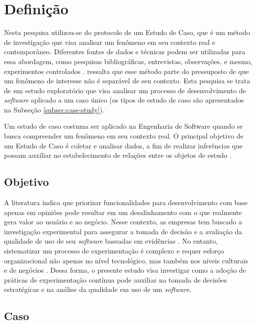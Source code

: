 \section{Definição}

Nesta pesquisa utilizou-se do protocolo de um Estudo de Caso, que é um método de investigação que visa analisar um fenômeno em seu contexto real e contemporâneo. Diferentes fontes de dados e técnicas podem ser utilizadas para essa abordagem, como pesquisas bibliográficas, entrevistas, observações, e mesmo, experimentos controlados \cite{wohlin_experimentation_2012}.  ressalta que esse método parte do pressuposto de que um fenômeno de interesse não é separável de seu contexto. Esta pesquisa se trata de um estudo exploratório que visa analisar um processo de desenvolvimento de \textit{software} aplicado a um caso único (os tipos de estudo de caso são apresentados na Subseção \ref{subsec:case-study}).

Um estudo de caso costuma ser aplicado na Engenharia de Software quando se busca compreender um fenômeno em seu contexto real. O principal objetivo de um Estudo de Caso é coletar e analisar dados, a fim de realizar inferências que possam auxiliar no estabelecimento de relações entre os objetos de estudo \cite{wohlin_experimentation_2012}.


\subsection{Objetivo}

A literatura indica que priorizar funcionalidades para desenvolvimento com base apenas em opiniões pode resultar em um desalinhamento com o que realmente gera valor ao usuário e ao negócio. Nesse contexto, as empresas tem buscado a investigação experimental para assegurar a tomada de decisão e a avaliação da qualidade de uso de seu \textit{software} baseadas em evidências \cite{olsson_opinions_2014}. No entanto, sistematizar um processo de experimentação é complexo e requer esforço organizacional não apenas no nível tecnológico, mas também nos níveis culturais e de negócios \cite{fabijan_evolution_2017}. Dessa forma, o presente estudo visa investigar como a adoção de práticas de experimentação contínua pode auxiliar na tomada de decisões estratégicas e na análise da qualidade em uso de um \textit{software}.

\subsection{Caso}

